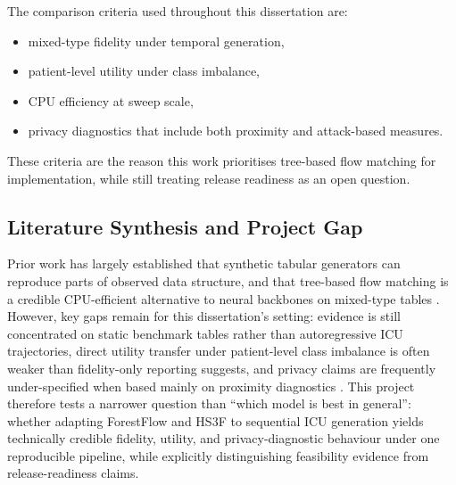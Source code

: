 The comparison criteria used throughout this dissertation are:
\begin{itemize}\tightlist
    \item mixed-type fidelity under temporal generation,
    \item patient-level utility under class imbalance,
    \item CPU efficiency at sweep scale,
    \item privacy diagnostics that include both proximity and attack-based measures.
\end{itemize}
These criteria are the reason this work prioritises tree-based flow matching for implementation, while still treating release readiness as an open question.

\subsection{Literature Synthesis and Project Gap}
Prior work has largely established that synthetic tabular generators can reproduce parts of observed data structure, and that tree-based flow matching is a credible CPU-efficient alternative to neural backbones on mixed-type tables \cite{jolicoeur2023forest,akazan2024hs3f}. However, key gaps remain for this dissertation's setting: evidence is still concentrated on static benchmark tables rather than autoregressive ICU trajectories, direct utility transfer under patient-level class imbalance is often weaker than fidelity-only reporting suggests, and privacy claims are frequently under-specified when based mainly on proximity diagnostics \cite{yao2025dcrdelusion,kaabachi2025scoping}. This project therefore tests a narrower question than ``which model is best in general'': whether adapting ForestFlow and HS3F to sequential ICU generation yields technically credible fidelity, utility, and privacy-diagnostic behaviour under one reproducible pipeline, while explicitly distinguishing feasibility evidence from release-readiness claims.
